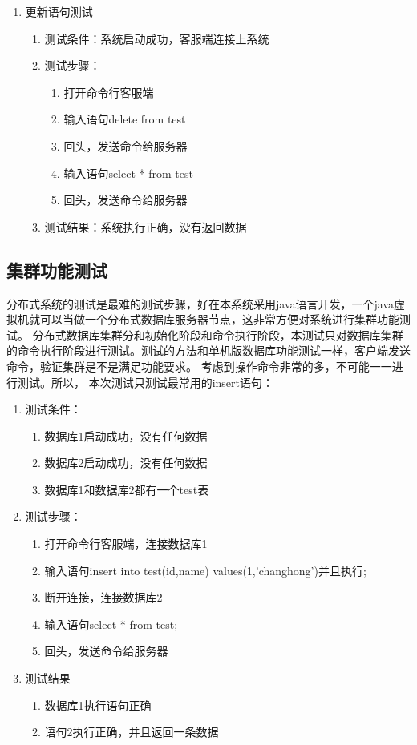 \begin{enumerate}
\item 更新语句测试
\begin{enumerate}
	\item 测试条件：系统启动成功，客服端连接上系统
	\item 测试步骤：
	\begin{enumerate}
		\item 打开命令行客服端
		\item 输入语句delete from test
		\item 回头，发送命令给服务器
		\item 输入语句select * from test
		\item 回头，发送命令给服务器
	\end{enumerate}
	\item 	测试结果：系统执行正确，没有返回数据
\end{enumerate}	


\end{enumerate}	
\subsection{集群功能测试}
分布式系统的测试是最难的测试步骤，好在本系统采用java语言开发，一个java虚拟机就可以当做一个分布式数据库服务器节点，这非常方便对系统进行集群功能测试。
分布式数据库集群分和初始化阶段和命令执行阶段，本测试只对数据库集群的命令执行阶段进行测试。测试的方法和单机版数据库功能测试一样，客户端发送命令，验证集群是不是满足功能要求。
考虑到操作命令非常的多，不可能一一进行测试。所以，
本次测试只测试最常用的insert语句：
\begin{enumerate}
	\item 测试条件：
	\begin{enumerate}
		\item 数据库1启动成功，没有任何数据
		\item 数据库2启动成功，没有任何数据
		\item 数据库1和数据库2都有一个test表
	\end{enumerate}
	\item 测试步骤：
	\begin{enumerate}
		\item 打开命令行客服端，连接数据库1
		\item 输入语句insert into test(id,name) values(1,'changhong')并且执行;
		\item 断开连接，连接数据库2
		\item 输入语句select * from test;
		\item 回头，发送命令给服务器
	\end{enumerate}
	\item 	测试结果
	\begin{enumerate}
		\item 数据库1执行语句正确
		\item 语句2执行正确，并且返回一条数据
	\end{enumerate}
\end{enumerate}	
